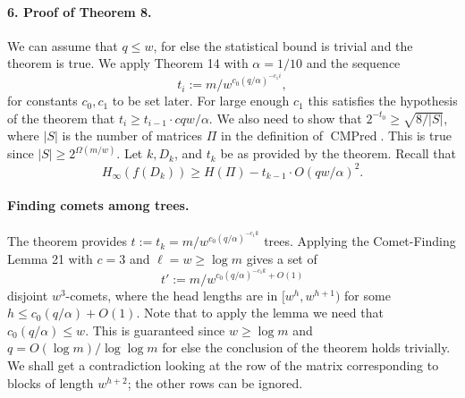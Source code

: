 \paragraph{6. Proof of Theorem 8.}
We can assume that $q\leq w$, for else the statistical bound is trivial and the theorem is true. We apply Theorem 14 with $\alpha=1/10$ and the sequence
\[t_i:=m/w^{c_0(q/\alpha)^{-c_1i}},\]
for constants $c_0,c_1$ to be set later. For large enough $c_1$ this satisfies the hypothesis of the theorem that $t_i\geq t_{i-1}\cdot cqw/\alpha$. We also need to show that $2^{-t_0}\geq\sqrt{8/|S|}$, where $|S|$ is the number of matrices $\Pi$ in the definition of $\operatorname{CMPred}$. This is true since $|S|\geq2^{\Omega(m/w)}$.
Let $k,D_k$, and $t_k$ be as provided by the theorem. Recall that
\[H_\infty(f(D_k))\geq H(\Pi)-t_{k-1}\cdot O(qw/\alpha)^2.\]
\paragraph{Finding comets among trees.}
The theorem provides $t:=t_k=m/w^{c_0(q/\alpha)^{-c_1k}}$ trees. Applying the Comet-Finding Lemma 21 with $c=3$ and $\ell=w\geq\log m$ gives a set of
\[t':=m/w^{c_0(q/\alpha)^{-c_1k}+O(1)}\]
disjoint $w^3$-comets, where the head lengths are in $[w^h,w^{h+1})$ for some $h\leq c_0(q/\alpha)+O(1)$. Note that to apply the lemma we need that $c_0(q/\alpha)\leq w$. This is guaranteed since $w\geq\log m$ and $q=O(\log m)/\log\log m$ for else the conclusion of the theorem holds trivially.
We shall get a contradiction looking at the row of the matrix corresponding to blocks of length $w^{h+2}$; the other rows can be ignored.
